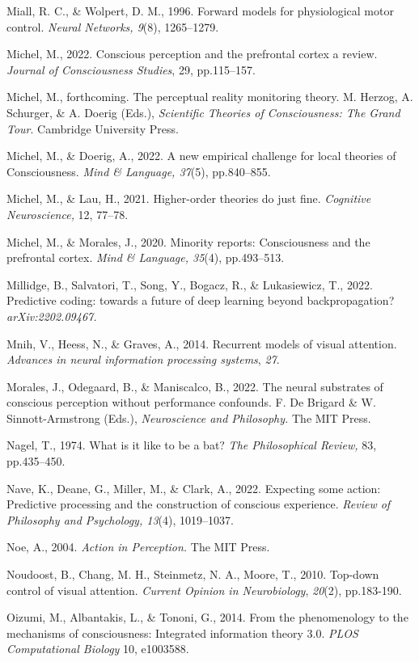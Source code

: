 \documentclass[12pt]{article}
\begin{document}
Miall, R. C., \& Wolpert, D. M., 1996. Forward models for physiological
motor control. \emph{Neural Networks, 9}(8), 1265--1279.

Michel, M., 2022. Conscious perception and the prefrontal cortex a
review. \emph{Journal of Consciousness Studies}, 29, pp.115--157.

Michel, M., forthcoming. The perceptual reality monitoring theory. M.
Herzog, A. Schurger, \& A. Doerig (Eds.), \emph{Scientific Theories of
Consciousness: The Grand Tour}. Cambridge University Press.

Michel, M., \& Doerig, A., 2022. A new empirical challenge for local
theories of Consciousness. \emph{Mind \& Language, 37}(5), pp.840--855.

Michel, M., \& Lau, H., 2021. Higher-order theories do just fine.
\emph{Cognitive Neuroscience,} 12, 77--78.

Michel, M., \& Morales, J., 2020. Minority reports: Consciousness and
the prefrontal cortex. \emph{Mind \& Language, 35}(4), pp.493--513.

Millidge, B., Salvatori, T., Song, Y., Bogacz, R., \& Lukasiewicz, T.,
2022. Predictive coding: towards a future of deep learning beyond
backpropagation? \emph{arXiv:2202.09467.}

Mnih, V., Heess, N., \& Graves, A., 2014. Recurrent models of visual
attention. \emph{Advances in neural information processing systems},
\emph{27}.

Morales, J., Odegaard, B., \& Maniscalco, B., 2022. The neural
substrates of conscious perception without performance confounds. F. De
Brigard \& W. Sinnott-Armstrong (Eds.), \emph{Neuroscience and
Philosophy.} The MIT Press.

Nagel, T., 1974. What is it like to be a bat? \emph{The Philosophical
Review,} 83, pp.435--450.

Nave, K., Deane, G., Miller, M., \& Clark, A., 2022. Expecting some
action: Predictive processing and the construction of conscious
experience. \emph{Review of Philosophy and Psychology, 13}(4),
1019--1037.

Noe, A., 2004. \emph{Action in Perception.} The MIT Press.

Noudoost, B., Chang, M. H., Steinmetz, N. A., Moore, T., 2010. Top-down
control of visual attention. \emph{Current Opinion in Neurobiology},
\emph{20}(2), pp.183-190.

Oizumi, M., Albantakis, L., \& Tononi, G., 2014. From the phenomenology
to the mechanisms of consciousness: Integrated information theory 3.0.
\emph{PLOS Computational Biology} 10, e1003588.
\end{document}
